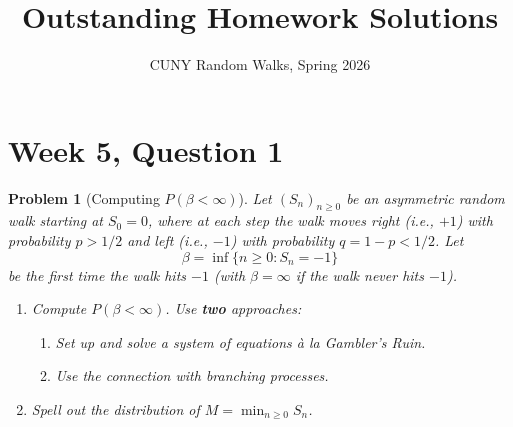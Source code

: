 \documentclass[12pt]{article}
\title{Outstanding Homework Solutions}
\author{CUNY Random Walks, Spring 2026}
\date{}
\newtheorem{problem}{Problem}
\theoremstyle{remark}
\newcommand{\1}{\mathbf{1}}
\begin{document}
\maketitle

\section*{Week 5, Question 1}

\begin{problem}[Computing $P(\beta < \infty)$]
Let $(S_n)_{n \ge 0}$ be an asymmetric random walk starting at $S_0 = 0$, where at
each step the walk moves right (i.e., $+1$) with probability $p > 1/2$ and left (i.e.,
$-1$) with probability $q = 1-p < 1/2$.  Let
\[
  \beta = \inf\{n \ge 0 : S_n = -1\}
\]
be the first time the walk hits $-1$ (with $\beta = \infty$ if the walk never hits $-1$).
\begin{enumerate}
  \item[(1)] Compute $P(\beta < \infty)$.  Use \textbf{two} approaches:
    \begin{enumerate}
      \item[(A)] Set up and solve a system of equations \`{a} la Gambler's Ruin.
      \item[(B)] Use the connection with branching processes.
    \end{enumerate}
  \item[(2)] Spell out the distribution of $M = \min_{n \ge 0} S_n$.
\end{enumerate}
\end{problem}
\end{document}
